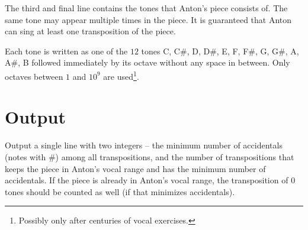 The third and final line contains the tones that Anton's piece consists of.
The same tone may appear multiple times in the piece.
It is guaranteed that Anton can sing at least one transposition of the piece.

Each tone is written as one of the $12$ tones C, C\#, D, D\#, E, F, F\#, G, G\#, A, A\#, B followed immediately by its octave without any space in between.
Only octaves between $1$ and $10^9$ are used\footnote{Possibly only after centuries of vocal exercises.}.

\section*{Output}
Output a single line with two integers -- the minimum number of accidentals (notes with \#) among all transpositions, and the number of transpositions that keeps the piece in Anton's vocal range and has the minimum number of accidentals.
If the piece is already in Anton's vocal range, the transposition of $0$ tones should be counted as well (if that minimizes accidentals).
